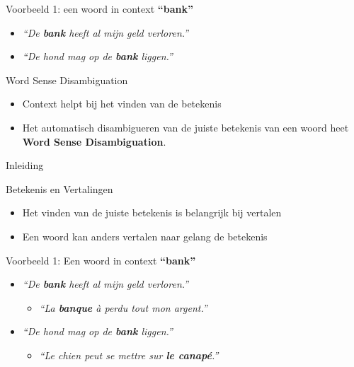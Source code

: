 \documentclass[8pt]{beamer}
\begin{document}
\begin{frame}

    \begin{block}{Voorbeeld 1: een woord in context}
        {\Large\textbf{``bank''}}
        \begin{itemize}
            \item \emph{``De \textbf{bank} heeft al mijn geld verloren.''}
            \item \emph{``De hond mag op de \textbf{bank} liggen.''}
        \end{itemize}
    \end{block}

    \begin{block}{Word Sense Disambiguation}
        \begin{itemize}
            \item Context helpt bij het vinden van de betekenis
            \item Het automatisch disambigueren van de juiste betekenis van een woord heet \textbf{Word Sense Disambiguation}.
        \end{itemize}
    \end{block}
\end{frame}


\begin{frame}{Inleiding}

    \begin{block}{Betekenis en Vertalingen}
        \begin{itemize}
            \item Het vinden van de juiste betekenis is belangrijk bij vertalen
            \item Een woord kan anders vertalen naar gelang de betekenis
        \end{itemize}
    \end{block}

    \begin{block}{Voorbeeld 1: Een woord in context}
        {\Large\textbf{``bank''}}
        \begin{itemize}
            \item \emph{``De \textbf{bank} heeft al mijn geld verloren.''}
            \begin{itemize}
                \item \emph{``La \textbf{banque} à perdu tout mon argent.''}
            \end{itemize}
            \item \emph{``De hond mag op de \textbf{bank} liggen.''}
            \begin{itemize}
                \item \emph{``Le chien peut se mettre sur \textbf{le canapé}.''}
            \end{itemize}
        \end{itemize}
    \end{block}



\end{frame}
\end{document}
